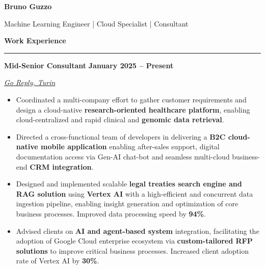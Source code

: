 \documentclass[9pt, a4paper]{article}
\newcommand{\cvsection}[1]{%
	\vspace{2pt}\par
	{\Large\bfseries\color{sectionblue}#1}\par
	\vspace{2pt}\hrule\vspace{6pt}
}
\newcommand{\cvsubsection}[3]{%
	\par {\large\bfseries #1} \hfill {\bfseries #2} \par {\textit{#3}} \vspace{4pt}
}
\begin{document}
	
	\begin{center}
		{\Huge\bfseries Bruno Guzzo}\par
		\vspace{4pt}
		{\Large Machine Learning Engineer | Cloud Specialist | Consultant}
	\end{center}
	
	\begin{minipage}[t]{0.67\linewidth}
		\vspace{0pt} %
		
		\cvsection{Work Experience}
		
		\cvsubsection{Mid-Senior Consultant}{January 2025 -- Present}{\href{https://www.reply.com/go-reply/en}{Go Reply, Turin}}
		
		\begin{itemize}[leftmargin=*, nosep]
			\item \footnotesize Coordinated a multi-company effort to gather customer requirements and design a cloud-native \textbf{research-oriented healthcare platform}, enabling cloud-centralized and rapid clinical and \textbf{genomic data retrieval}.     
			
			\vspace{2pt}
			\item \footnotesize Directed a cross-functional team of developers in delivering a \textbf{B2C cloud-native mobile application} enabling after-sales support, digital documentation access via Gen-AI chat-bot and seamless multi-cloud business-end \textbf{CRM integration}.   
			
			\vspace{2pt}
			\item \footnotesize Designed and implemented scalable \textbf{legal treaties search engine and RAG solution} using \textbf{Vertex AI} with a high-efficient and concurrent data ingestion pipeline, enabling insight generation and optimization of core business processes. 
			Improved data processing speed by \textbf{94\%}.  
			
			\vspace{2pt}		
			\item \footnotesize Advised clients on \textbf{AI and agent-based system} integration, facilitating the adoption of Google Cloud enterprise ecosystem via \textbf{custom-tailored RFP solutions} to improve critical business processes.
			Increased client adoption rate of Vertex AI by \textbf{30\%}.  
			

\end{itemize}
\end{minipage}
\end{document}

